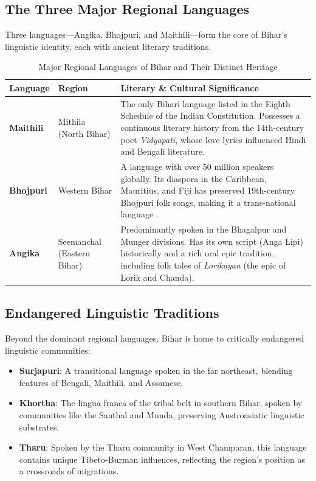 \documentclass{article}
\begin{document}
\subsection{The Three Major Regional Languages}
Three languages—Angika, Bhojpuri, and Maithili—form the core of Bihar’s linguistic identity, each with ancient literary traditions.
\begin{table}[h!]
\centering
\begin{tabular}{p{2.5cm}p{4.5cm}p{6cm}}
\toprule
\textbf{Language} & \textbf{Region} & \textbf{Literary \& Cultural Significance} \\
\midrule
\textbf{Maithili} & Mithila (North Bihar) & The only Bihari language listed in the Eighth Schedule of the Indian Constitution. Possesses a continuous literary history from the 14th-century poet \textit{Vidyapati}, whose love lyrics influenced Hindi and Bengali literature. \\
\hline
\textbf{Bhojpuri} & Western Bihar & A language with over 50 million speakers globally. Its diaspora in the Caribbean, Mauritius, and Fiji has preserved 19th-century Bhojpuri folk songs, making it a trans-national language \cite{pandey2015bhojpuri}. \\
\hline
\textbf{Angika} & Seemanchal (Eastern Bihar) & Predominantly spoken in the Bhagalpur and Munger divisions. Has its own script (Anga Lipi) historically and a rich oral epic tradition, including folk tales of \textit{Lorikayan} (the epic of Lorik and Chanda). \\
\bottomrule
\end{tabular}
\caption{Major Regional Languages of Bihar and Their Distinct Heritage}
\end{table}

\subsection{Endangered Linguistic Traditions}
Beyond the dominant regional languages, Bihar is home to critically endangered linguistic communities:
\begin{itemize}[leftmargin=*]
    \item \textbf{Surjapuri}: A transitional language spoken in the far northeast, blending features of Bengali, Maithili, and Assamese.
    \item \textbf{Khortha}: The lingua franca of the tribal belt in southern Bihar, spoken by communities like the Santhal and Munda, preserving Austroasiatic linguistic substrates.
    \item \textbf{Tharu}: Spoken by the Tharu community in West Champaran, this language contains unique Tibeto-Burman influences, reflecting the region’s position as a crossroads of migrations.
\end{itemize}
\end{document}

